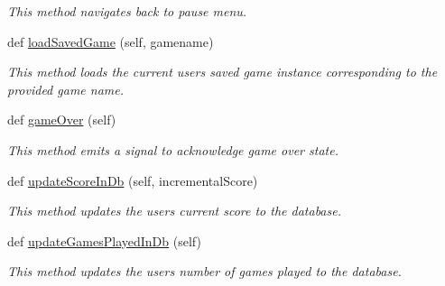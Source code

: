 \begin{DoxyCompactItemize}
\begin{DoxyCompactList}\small\item\em This method navigates back to pause menu. \end{DoxyCompactList}\item 
\hypertarget{classsrc_1_1game_1_1_game_a8e215b6533b7fa858334453633e12e6e}{}def \hyperlink{classsrc_1_1game_1_1_game_a8e215b6533b7fa858334453633e12e6e}{load\+Saved\+Game} (self, gamename)\label{classsrc_1_1game_1_1_game_a8e215b6533b7fa858334453633e12e6e}

\begin{DoxyCompactList}\small\item\em This method loads the current user\textquotesingle{}s saved game instance corresponding to the provided game name. \end{DoxyCompactList}\item 
\hypertarget{classsrc_1_1game_1_1_game_ae864ef349cf3b094874543fab2210a37}{}def \hyperlink{classsrc_1_1game_1_1_game_ae864ef349cf3b094874543fab2210a37}{game\+Over} (self)\label{classsrc_1_1game_1_1_game_ae864ef349cf3b094874543fab2210a37}

\begin{DoxyCompactList}\small\item\em This method emits a signal to acknowledge game over state. \end{DoxyCompactList}\item 
\hypertarget{classsrc_1_1game_1_1_game_a85c98d60278dc78a465e40b5e3c57579}{}def \hyperlink{classsrc_1_1game_1_1_game_a85c98d60278dc78a465e40b5e3c57579}{update\+Score\+In\+Db} (self, incremental\+Score)\label{classsrc_1_1game_1_1_game_a85c98d60278dc78a465e40b5e3c57579}

\begin{DoxyCompactList}\small\item\em This method updates the user\textquotesingle{}s current score to the database. \end{DoxyCompactList}\item 
\hypertarget{classsrc_1_1game_1_1_game_a45770f3f952d2738b599e04ade877296}{}def \hyperlink{classsrc_1_1game_1_1_game_a45770f3f952d2738b599e04ade877296}{update\+Games\+Played\+In\+Db} (self)\label{classsrc_1_1game_1_1_game_a45770f3f952d2738b599e04ade877296}

\begin{DoxyCompactList}\small\item\em This method updates the users\textquotesingle{} number of games played to the database. \end{DoxyCompactList}\end{DoxyCompactItemize}
